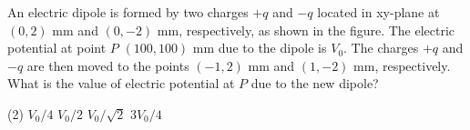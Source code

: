 \item An electric dipole is formed by two charges \(+q\) and \(-q\) located in xy-plane at \((0,2)\) mm and \((0,-2)\) mm, respectively, as shown in the figure. The electric potential at point \(P\) \((100,100)\) mm due to the dipole is \(V_0\). The charges \(+q\) and \(-q\) are then moved to the points \((-1,2)\) mm and \((1,-2)\) mm, respectively. What is the value of electric potential at \(P\) due to the new dipole?
        \begin{tasks}(2)
        	\task \(V_0/4\)
        	\task \(V_0/2\)
        	\task \(V_0/\sqrt{2}\)
        	\task \(3V_0/4\)
        \end{tasks}
